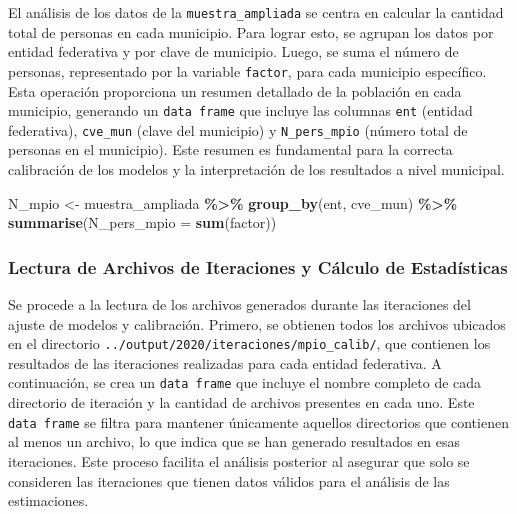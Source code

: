 \documentclass[
  12pt,
]{book}
\newenvironment{Shaded}{\begin{snugshade}}{\end{snugshade}}
\newcommand{\AttributeTok}[1]{\textcolor[rgb]{0.13,0.29,0.53}{#1}}
\newcommand{\FunctionTok}[1]{\textcolor[rgb]{0.13,0.29,0.53}{\textbf{#1}}}
\newcommand{\NormalTok}[1]{#1}
\newcommand{\OtherTok}[1]{\textcolor[rgb]{0.56,0.35,0.01}{#1}}
\newcommand{\SpecialCharTok}[1]{\textcolor[rgb]{0.81,0.36,0.00}{\textbf{#1}}}
\begin{document}
El análisis de los datos de la \texttt{muestra\_ampliada} se centra en calcular la cantidad total de personas en cada municipio. Para lograr esto, se agrupan los datos por entidad federativa y por clave de municipio. Luego, se suma el número de personas, representado por la variable \texttt{factor}, para cada municipio específico. Esta operación proporciona un resumen detallado de la población en cada municipio, generando un \texttt{data\ frame} que incluye las columnas \texttt{ent} (entidad federativa), \texttt{cve\_mun} (clave del municipio) y \texttt{N\_pers\_mpio} (número total de personas en el municipio). Este resumen es fundamental para la correcta calibración de los modelos y la interpretación de los resultados a nivel municipal.

\begin{Shaded}
\begin{Highlighting}[]
\NormalTok{N\_mpio }\OtherTok{\textless{}{-}}\NormalTok{ muestra\_ampliada }\SpecialCharTok{\%\textgreater{}\%} \FunctionTok{group\_by}\NormalTok{(ent, cve\_mun) }\SpecialCharTok{\%\textgreater{}\%}
  \FunctionTok{summarise}\NormalTok{(}\AttributeTok{N\_pers\_mpio =} \FunctionTok{sum}\NormalTok{(factor))}
\end{Highlighting}
\end{Shaded}

\hypertarget{lectura-de-archivos-de-iteraciones-y-cuxe1lculo-de-estaduxedsticas}{%
\subsubsection*{Lectura de Archivos de Iteraciones y Cálculo de Estadísticas}\label{lectura-de-archivos-de-iteraciones-y-cuxe1lculo-de-estaduxedsticas}}

Se procede a la lectura de los archivos generados durante las iteraciones del ajuste de modelos y calibración. Primero, se obtienen todos los archivos ubicados en el directorio \texttt{../output/2020/iteraciones/mpio\_calib/}, que contienen los resultados de las iteraciones realizadas para cada entidad federativa. A continuación, se crea un \texttt{data\ frame} que incluye el nombre completo de cada directorio de iteración y la cantidad de archivos presentes en cada uno. Este \texttt{data\ frame} se filtra para mantener únicamente aquellos directorios que contienen al menos un archivo, lo que indica que se han generado resultados en esas iteraciones. Este proceso facilita el análisis posterior al asegurar que solo se consideren las iteraciones que tienen datos válidos para el análisis de las estimaciones.
\end{document}

